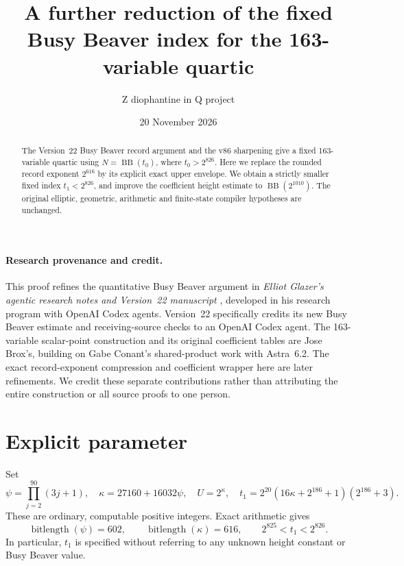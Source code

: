 \documentclass[11pt]{article}
\title{A further reduction of the fixed Busy Beaver index for the 163-variable quartic}
\author{Z diophantine in Q project}
\date{20 November 2026}
\newcommand{\BB}{\operatorname{BB}}
\begin{document}
\maketitle

\begin{abstract}
The Version~22 Busy Beaver record argument and the v86 sharpening
give a fixed 163-variable quartic using $N=\BB(t_0)$, where
$t_0>2^{826}$. Here we replace the rounded record exponent
$2^{616}$ by its explicit exact upper envelope. We obtain a strictly
smaller fixed index $t_1<2^{826}$, and improve the coefficient
height estimate to $\BB(2^{1010})$. The original elliptic, geometric,
arithmetic and finite-state compiler hypotheses are unchanged.
\end{abstract}

\paragraph{Research provenance and credit.}
This proof refines the quantitative Busy Beaver argument in
\emph{Elliot Glazer's agentic research notes and Version~22 manuscript}
\cite{v22}, developed in his research program with OpenAI Codex
agents. Version~22 specifically credits its new Busy Beaver estimate
and receiving-source checks to an OpenAI Codex agent. The
163-variable scalar-point construction and its original coefficient
tables are Jose Brox's, building on Gabe Conant's
shared-product work with Astra~6.2. The exact record-exponent
compression and coefficient wrapper here are later refinements.
We credit these separate contributions rather than attributing
the entire construction or all source proofs to one person.

\section{Explicit parameter}
Set
\begin{equation}\label{eq:parameters}
 \psi=\prod_{j=2}^{90}(3j+1),\quad
 \kappa=27160+16032\psi,\quad
 U=2^\kappa,\quad
 t_1=2^{20}(16\kappa+2^{186}+1)(2^{186}+3).
\end{equation}
These are ordinary, computable positive integers. Exact arithmetic gives
\begin{equation}\label{eq:bits}
 \operatorname{bitlength}(\psi)=602,\qquad
 \operatorname{bitlength}(\kappa)=616,\qquad
 2^{825}<t_1<2^{826}.
\end{equation}
In particular, $t_1$ is specified without referring to any unknown
height constant or Busy Beaver value.
\end{document}
